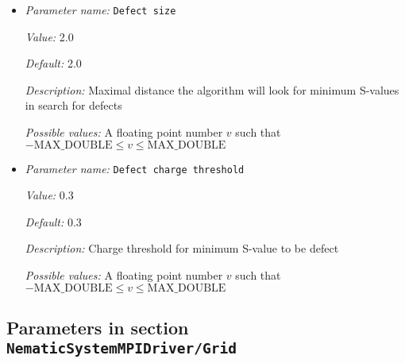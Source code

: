 \begin{itemize}
\item {\it Parameter name:} {\tt Defect size}
\label{parameters:NematicSystemMPIDriver/Defect detection/Defect size}
\label{parameters:NematicSystemMPIDriver/Defect_20detection/Defect_20size}


{\it Value:} 2.0


{\it Default:} 2.0


{\it Description:} Maximal distance the algorithm will look for minimum S-values in search for defects


{\it Possible values:} A floating point number $v$ such that $-\text{MAX\_DOUBLE} \leq v \leq \text{MAX\_DOUBLE}$
\item {\it Parameter name:} {\tt Defect charge threshold}
\label{parameters:NematicSystemMPIDriver/Defect detection/Defect charge threshold}
\label{parameters:NematicSystemMPIDriver/Defect_20detection/Defect_20charge_20threshold}


{\it Value:} 0.3


{\it Default:} 0.3


{\it Description:} Charge threshold for minimum S-value to be defect


{\it Possible values:} A floating point number $v$ such that $-\text{MAX\_DOUBLE} \leq v \leq \text{MAX\_DOUBLE}$
\end{itemize}

\subsection{Parameters in section \tt NematicSystemMPIDriver/Grid}
\label{parameters:NematicSystemMPIDriver/Grid}

